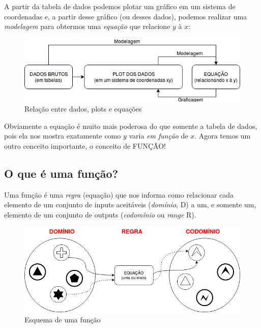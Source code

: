 \documentclass[pdftex, brazil, 12pt, twoside]{article}
\begin{document}
A partir da tabela de dados podemos plotar um gráfico em um sistema de coordenadas
e, a partir desse gráfico (ou desses dados), podemos realizar uma \emph{modelagem}
para obtermos uma \emph{equação} que relacione $y$ à $x$:

\begin{figure}[ht]
  \begin{center}
    \caption{Relação entre dados, plots e equações}
    \label{fig:relacao-dados-plots-equacoes}
    \includegraphics[scale=0.7]{imagens/relacao_dados_plot_equacao.png}
    
  \end{center}
\end{figure}

Obviamente a equação é muito mais poderosa do que somente a tabela de dados, pois
ela nos mostra exatamente como $y$ varia \emph{em função} de $x$. Agora temos
um outro conceito importante, o conceito de FUNÇÃO!


\subsection{O que é uma função?}
\label{funcoes-conceito}

Uma função é uma \emph{regra} (equação) que nos informa como relacionar cada elemento
de um conjunto de inputs aceitáveis (\emph{domínio}, D) a um, e somente um,
elemento de um conjunto de outputs (\emph{codomínio} ou \emph{range} R).

\begin{figure}[H]
  \begin{center}
    \caption{Esquema de uma função}
    \label{fig:esquema-funcao}
    \includegraphics[scale=0.5]{imagens/esquema-funcao.png}
    
  \end{center}
\end{figure}
\end{document}
